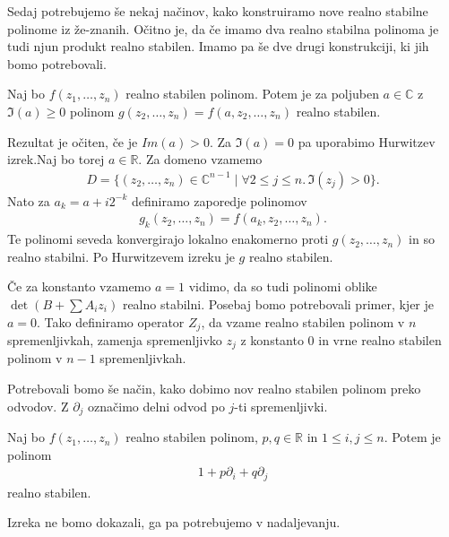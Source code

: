 Sedaj potrebujemo še nekaj načinov, kako konstruiramo nove realno stabilne polinome iz že-znanih. Očitno je, da če imamo dva realno stabilna polinoma je tudi njun produkt realno stabilen. Imamo pa še dve drugi konstrukciji, ki jih bomo potrebovali\cite{wagner-multivariate}.
\begin{izrek}
    Naj bo \(f(z_1, \ldots, z_n)\) realno stabilen polinom. Potem je za poljuben \(a\in \mathbb C\) z \(\Im(a)\geq 0\) polinom \(g(z_2, \ldots, z_n) = f(a, z_2, \ldots, z_n)\) realno stabilen.
\end{izrek}
\begin{dokaz}
    Rezultat je očiten, če je \(Im(a) > 0\). Za \(\Im(a) = 0\) pa uporabimo Hurwitzev izrek.Naj bo torej \(a\in \mathbb R\). Za domeno vzamemo 
    \begin{align*}
        D=\{(z_2,\ldots,z_n) \in \mathbb C^{n-1}\mid \forall 2\leq j \leq n.\, \Im(z_j)> 0\}.
    \end{align*}
    Nato za \(a_k = a + i 2^{-k}\) definiramo zaporedje polinomov
    \begin{align*}
        g_k(z_2, \ldots, z_n) = f(a_k, z_2, \ldots, z_n).
    \end{align*}
    Te polinomi seveda konvergirajo lokalno enakomerno proti \(g(z_2, \ldots, z_n)\) in so realno stabilni. Po Hurwitzevem izreku je \(g\) realno stabilen.
\end{dokaz}
Če za konstanto vzamemo \(a=1\) vidimo, da so tudi polinomi oblike \(\det(B + \sum A_i z_i)\) realno stabilni.
Posebaj bomo potrebovali primer, kjer je \(a = 0\). Tako definiramo operator \(Z_j\), da vzame realno stabilen polinom v \(n\) spremenljivkah, zamenja spremenljivko \(z_j\) z konstanto \(0\) in vrne realno stabilen polinom v \(n-1\) spremenljivkah.

Potrebovali bomo še način, kako dobimo nov realno stabilen polinom preko odvodov. Z \(\partial_j\) označimo delni odvod po \(j\)-ti spremenljivki\cite{Borcea_2010}.
\begin{izrek}
    Naj bo \(f(z_1, \ldots, z_n)\) realno stabilen polinom, \(p, q\in \mathbb R\) in \(1\leq i, j \leq n\). Potem je polinom
    \begin{align*}
        1+p\partial_i + q\partial_j
    \end{align*}
    realno stabilen.
\end{izrek}
Izreka ne bomo dokazali, ga pa potrebujemo v nadaljevanju.

